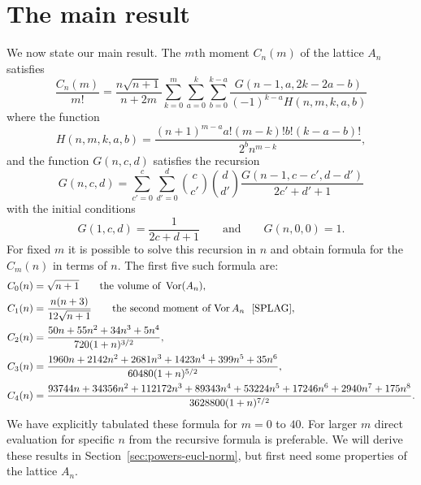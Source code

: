\documentclass[draftcls, onecolumn, 11pt]{IEEEtran}
\begin{document}
\section{The main result}\label{sec:main-result}

We now state our main result.  The $m$th moment $C_n(m)$ of the lattice $A_n$ satisfies
\begin{equation}\label{eq:theCmformula}
\frac{C_n(m)}{m!} = \frac{n\sqrt{n+1}}{n+2m}\sum_{k=0}^{m}\sum_{a =0}^{k}\sum_{b=0}^{k-a} \frac{G(n-1,a,2k - 2a - b)}{(-1)^{k-a}H(n,m,k,a,b)} 
\end{equation}
where the function
\[
H(n,m,k,a,b) = \frac{(n+1)^{m-a}a!(m-k)!b! (k-a-b)!}{2^{b} n^{m-k}},
\]
and the function $G(n,c,d)$ satisfies the recursion
\begin{equation}\label{eq:theGrecursion}
G(n,c,d) = \sum_{c'=0}^{c} \sum_{d'=0}^{d} \binom{c}{c'}\binom{d}{d'} \frac{G(n-1,c-c',d-d')}{2c'+d'+1}
\end{equation}
with the initial conditions
\[
G(1,c,d) = \frac{1}{2c+d+1} \qquad \text{and} \qquad G(n,0,0) = 1.
\]
For fixed $m$ it is possible to solve this recursion in $n$ and obtain formula for the $C_m(n)$ in terms of $n$.  The first five such formula are:
\begin{align*}
C_0(n) &= \sqrt{n+1} \qquad \text{the volume of } \vor(A_n),\\
C_1(n) &= \frac{n(n+3)}{12\sqrt{n+1}} \qquad \text{the second moment of $\vor{A_n}$~ \cite[p. 462]{SPLAG}}, \\
C_2(n) &=  \frac{50 n + 55 n^2 + 34 n^3 + 5 n^4}{720 (1 + n)^{3/2}}, \\
C_3(n) &= \frac{1960 n + 2142 n^2 + 2681 n^3 + 1423 n^4 + 399 n^5 + 35 n^6}{60480 (1 + n)^{5/2}}, \\
C_4(n) &= \frac{93744 n + 34356 n^2 + 112172 n^3 + 89343 n^4 + 53224 n^5 + 17246 n^6 + 2940 n^7 + 175 n^8}{3628800 (1 + n)^{7/2}}.
\end{align*}
We have explicitly tabulated these formula for $m=0$ to $40$. For larger $m$ direct evaluation for specific $n$ from the recursive formula is preferable.  We will derive these results in Section~\ref{sec:powers-eucl-norm}, but first need some properties of the lattice $A_n$.
\end{document}
